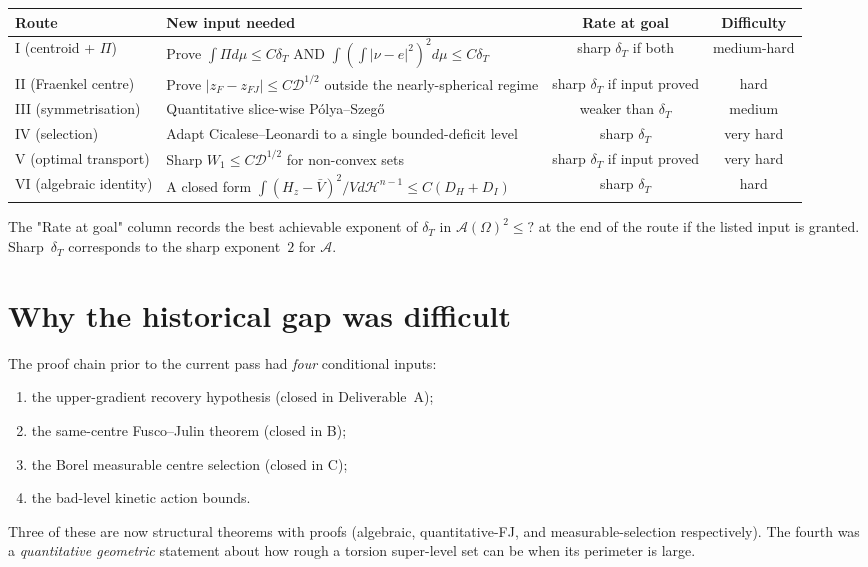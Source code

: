 \documentclass[11pt]{article}
\theoremstyle{definition}
\newcommand{\Om}{\Omega}
\newcommand{\Fr}{\mathcal{A}}
\newcommand{\Hn}{\mathcal H^{n-1}}
\newcommand{\dD}{\mathcal D}
\begin{document}
\begin{center}
\renewcommand{\arraystretch}{1.3}
\begin{tabular}{|l|p{5.5cm}|c|c|}
\hline
\textbf{Route} & \textbf{New input needed} & \textbf{Rate at goal} & \textbf{Difficulty} \\
\hline
I (centroid + $\Pi$)
   & Prove $\int\Pi d\mu\le C\delta_{T}$ AND $\int(\int|\nu-e|^{2})^{2}d\mu\le C\delta_{T}$
   & sharp $\delta_{T}$ if both
   & medium-hard \\
II (Fraenkel centre)
   & Prove $|z_{F}-z_{FJ}|\le C\dD^{1/2}$ outside the nearly-spherical regime
   & sharp $\delta_{T}$ if input proved
   & hard \\
III (symmetrisation)
   & Quantitative slice-wise P\'olya--Szeg\H{o}
   & weaker than $\delta_{T}$
   & medium \\
IV (selection)
   & Adapt Cicalese--Leonardi to a single bounded-deficit level
   & sharp $\delta_{T}$
   & very hard \\
V (optimal transport)
   & Sharp $W_{1}\le C\dD^{1/2}$ for non-convex sets
   & sharp $\delta_{T}$ if input proved
   & very hard \\
VI (algebraic identity)
   & A closed form
     $\int(H_{z}-\bar V)^{2}/V d\Hn\le C(D_{H}+D_{I})$
   & sharp $\delta_{T}$
   & hard \\
\hline
\end{tabular}
\end{center}

The "Rate at goal" column records the best achievable exponent of
$\delta_{T}$ in $\Fr(\Om)^{2}\le ?$ at the end of the route if the
listed input is granted.  Sharp~$\delta_{T}$ corresponds to the
sharp exponent~$2$ for $\Fr$.

\section{Why the historical gap was difficult}\label{sec:why}

The proof chain prior to the current pass had \emph{four} conditional
inputs:
\begin{enumerate}[label=(\arabic*)]
\item the upper-gradient recovery hypothesis (closed in Deliverable~A);
\item the same-centre Fusco--Julin theorem (closed in B);
\item the Borel measurable centre selection (closed in C);
\item the bad-level kinetic action bounds.
\end{enumerate}
Three of these are now structural theorems with proofs (algebraic,
quantitative-FJ, and measurable-selection respectively).  The fourth
was a \emph{quantitative geometric} statement about how rough a
torsion super-level set can be when its perimeter is large.
\end{document}
